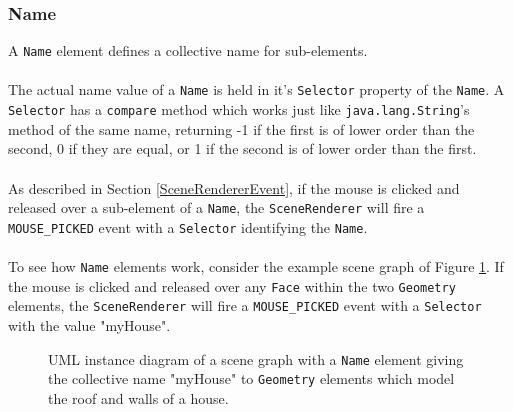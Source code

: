 \documentclass[10pt,aps, prb,preprint]{article}
\begin{document}
\subsubsection{Name}
A \texttt{Name} element defines a collective name for sub-elements. 
\\
\\
The actual name value of a \texttt{Name} is held in it's \texttt{Selector} property of the \texttt{Name}. A \texttt{Selector} has a \texttt{compare} method which works just like \texttt{java.lang.String}'s method of the same name,  returning -1 if the first is of lower order than the second, 0 if they are equal, or 1 if the second is of lower order than the first.
\\
\\
As described in Section \ref{SceneRendererEvent}, if the mouse is clicked and released over a sub-element of a \texttt{Name}, the \texttt{SceneRenderer} will fire a \texttt{MOUSE\_PICKED} event with a \texttt{Selector} identifying the \texttt{Name}.
\\
\\
To see how \texttt{Name} elements work, consider the example scene graph of Figure \ref{fig:nameExample}. If the mouse is clicked and released over any \texttt{Face} within the two \texttt{Geometry} elements, the \texttt{SceneRenderer} will fire a \texttt{MOUSE\_PICKED} event with a \texttt{Selector} with the value "myHouse".

\begin{figure}[!h]
\label{fig:nameExample}
\begin{center}
\caption{UML instance diagram of a scene graph with a \texttt{Name} element giving the collective name "myHouse" to \texttt{Geometry} elements which model the roof and walls of a house.}
\end{center}
\end{figure}
\end{document}
